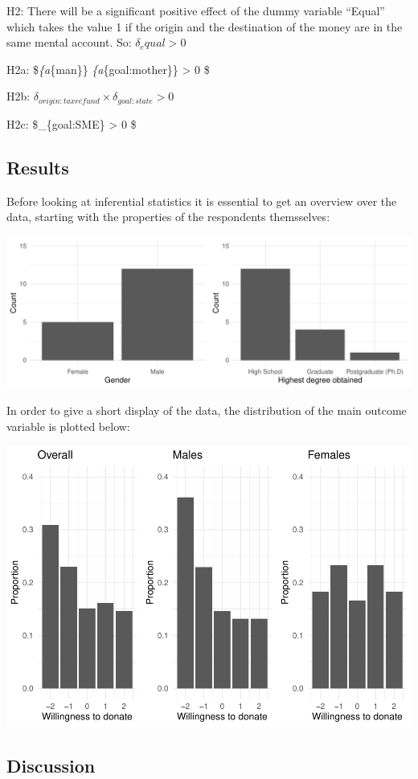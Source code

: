 \documentclass[
  12pt,
]{article}
\begin{document}
H2: There will be a significant positive effect of the dummy variable
``Equal'' which takes the value 1 if the origin and the destination of
the money are in the same mental account. So: \(\delta_equal > 0\)

H2a: \$\delta\emph{\{a}\{man\}\}
\times  \delta\emph{\{a}\{goal:mother\}\} \textgreater{} 0 \$

H2b: \(\delta_{origin:taxrefund} \times \delta_{goal:state} > 0\)

H2c: \$\delta\_\{goal:SME\} \textgreater{} 0 \$

\hypertarget{results}{%
\subsection{Results}\label{results}}

Before looking at inferential statistics it is essential to get an
overview over the data, starting with the properties of the respondents
themsselves:

\includegraphics[width=1.05\linewidth]{FSE_paper_files/figure-latex/unnamed-chunk-2-1}

In order to give a short display of the data, the distribution of the
main outcome variable is plotted below:

\includegraphics{FSE_paper_files/figure-latex/plotting_proportions-1.pdf}

\hypertarget{discussion}{%
\subsection{Discussion}\label{discussion}}
\end{document}
